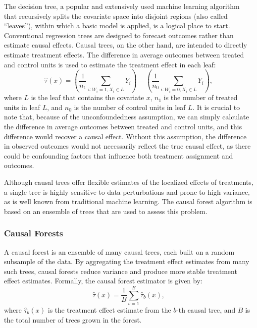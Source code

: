 \documentclass[
  12pt,
  a4paper,
  oneside]{article}
\begin{document}
The decision tree, a popular and extensively used machine learning
algorithm that recursively splits the covariate space into disjoint
regions (also called ``leaves''), within which a basic model is applied,
is a logical place to start. Conventional regression trees are designed
to forecast outcomes rather than estimate causal effects. Causal trees,
on the other hand, are intended to directly estimate treatment effects.
The difference in average outcomes between treated and control units is
used to estimate the treatment effect in each leaf:
\begin{equation} \label{eq:2}
\hat{\tau}(x) = \left( \frac{1}{n_1} \sum_{i: W_i = 1, X_i \in L} Y_i \right) - \left( \frac{1}{n_0} \sum_{i: W_i = 0, X_i \in L} Y_i \right),
\end{equation} where \(L\) is the leaf that contains the covariate
\(x\), \(n_1\) is the number of treated units in leaf \(L\), and \(n_0\)
is the number of control units in leaf \(L\). It is crucial to note
that, because of the unconfoundedness assumption, we can simply
calculate the difference in average outcomes between treated and control
units, and this difference would recover a causal effect. Without this
assumption, the difference in observed outcomes would not necessarily
reflect the true causal effect, as there could be confounding factors
that influence both treatment assignment and outcomes.

\qquad Although causal trees offer flexible estimates of the localized
effects of treatments, a single tree is highly sensitive to data
perturbations and prone to high variance, as is well known from
traditional machine learning. The causal forest algorithm is based on an
ensemble of trees that are used to assess this problem.

\subsubsection{Causal Forests}\label{causal-forests}

A causal forest is an ensemble of many causal trees, each built on a
random subsample of the data. By aggregating the treatment effect
estimates from many such trees, causal forests reduce variance and
produce more stable treatment effect estimates. Formally, the causal
forest estimator is given by: \begin{equation} \label{eq:3}
\hat{\tau}(x) = \frac{1}{B} \sum_{b=1}^{B} \hat{\tau}_b(x),
\end{equation} where \(\hat{\tau}_b(x)\) is the treatment effect
estimate from the \(b\)-th causal tree, and \(B\) is the total number of
trees grown in the forest.
\end{document}
